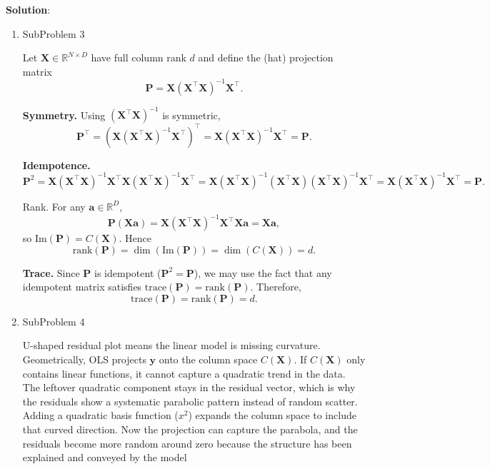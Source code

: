 \documentclass[submit]{harvardml}
\newenvironment{solution}{
    \vspace{2mm}
    \color{blue}\noindent\textbf{Solution}:
}{}
\begin{document}
\begin{solution}
\begin{enumerate}
\item SubProblem 3

Let $\mathbf X\in\mathbb R^{N\times D}$ have full column rank $d$ and define the (hat) projection matrix
\[
\mathbf P=\mathbf X(\mathbf X^\top \mathbf X)^{-1}\mathbf X^\top.
\] 

\textbf{Symmetry.}
Using $(\mathbf X^\top\mathbf X)^{-1}$ is symmetric,
\[
\mathbf P^\top
=\left(\mathbf X(\mathbf X^\top \mathbf X)^{-1}\mathbf X^\top\right)^\top
=\mathbf X(\mathbf X^\top \mathbf X)^{-1}\mathbf X^\top
=\mathbf P.
\]

\textbf{Idempotence.}
\[
\mathbf P^2
=\mathbf X(\mathbf X^\top \mathbf X)^{-1}\mathbf X^\top
\mathbf X(\mathbf X^\top \mathbf X)^{-1}\mathbf X^\top
=\mathbf X(\mathbf X^\top \mathbf X)^{-1}(\mathbf X^\top\mathbf X)(\mathbf X^\top \mathbf X)^{-1}\mathbf X^\top
=\mathbf X(\mathbf X^\top \mathbf X)^{-1}\mathbf X^\top
=\mathbf P.
\]

\textbf{}{Rank.}
For any $\mathbf a\in\mathbb R^D$,
\[
\mathbf P(\mathbf X\mathbf a)=\mathbf X(\mathbf X^\top \mathbf X)^{-1}\mathbf X^\top \mathbf X\mathbf a
=\mathbf X\mathbf a,
\]
so $\mathrm{Im}(\mathbf P)=C(\mathbf X)$. Hence
\[
\mathrm{rank}(\mathbf P)=\dim(\mathrm{Im}(\mathbf P))=\dim(C(\mathbf X))=d.
\]

\textbf{Trace.}
Since $\mathbf P$ is idempotent ($\mathbf P^2=\mathbf P$), we may use the fact that any idempotent
matrix satisfies $\mathrm{trace}(\mathbf P)=\mathrm{rank}(\mathbf P)$. Therefore,
\[
\mathrm{trace}(\mathbf P)=\mathrm{rank}(\mathbf P)=d.
\]
\item SubProblem 4

 U-shaped residual plot means the linear model is missing curvature.
Geometrically, OLS projects $\mathbf y$ onto the column space $C(\mathbf X)$.
If $C(\mathbf X)$ only contains linear functions, it cannot
capture a quadratic trend in the data. The leftover quadratic component stays
in the residual vector, which is why the residuals show a systematic parabolic
pattern instead of random scatter. Adding a quadratic basis function ($x^2$) expands the column space to include
that curved direction. Now the projection can capture the parabola, and the
residuals become more random around zero because the  structure has
been explained and conveyed by the model
	\end{enumerate}
\end{solution}

\newpage

\end{document}
